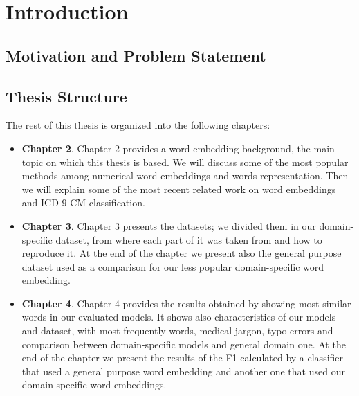 \chapter{Introduction}

\section{Motivation and Problem Statement}


\section{Thesis Structure}
The rest of this thesis is organized into the following chapters:
\begin{itemize}
	\item \textbf{Chapter 2}. Chapter 2 provides a word embedding background, the main topic on which this thesis is based. We will discuss some of the most popular methods among numerical word embeddings and words representation. Then we will explain some of the most recent related work on word embeddings and ICD-9-CM classification.
	\item \textbf{Chapter 3}. Chapter 3 presents the datasets; we divided them in our domain-specific dataset, from where each part of it was taken from and how to reproduce it. At the end of the chapter we present also the general purpose dataset used as a comparison for our less popular domain-specific word embedding.
	\item \textbf{Chapter 4}. Chapter 4 provides the results obtained by showing most similar words in our evaluated models. It shows also characteristics of our models and dataset, with most frequently words, medical jargon, typo errors and comparison between domain-specific models and general domain one. At the end of the chapter we present the results of the F1 calculated by a classifier that used a general purpose word embedding and another one that used our domain-specific word embeddings.
\end{itemize}